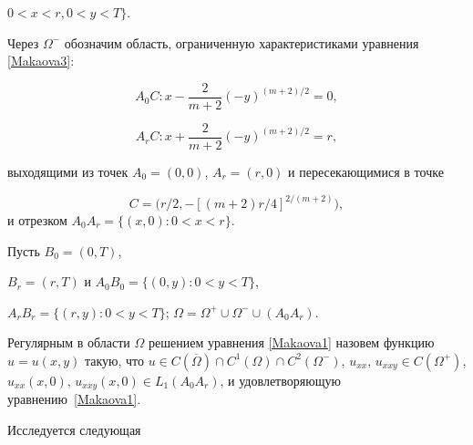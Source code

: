 \begin{minipage}{0.60\textwidth}

	\hspace{1em} %



$ 0<x<r, 0<y<T \}$. 

 Через $\Omega^-$ обозначим область, ограниченную характеристиками уравнения \eqref{Makaova3}:  

\[A_0C: x-\frac{2}{m+2}(-y)^{({m+2})/{2}}=0,

\]

\[A_rC: x+\frac{2}{m+2}(-y)^{({m+2})/{2}}=r,

\]

выходящими из точек $A_0=(0, 0)$, $A_r=(r, 0)$ и пересекающимися в точке 

$$C=\bigl(r/2, - [(m+2)r/4]^{2/(m+2)} \bigr),$$ и отрезком $A_0A_r=\{(x,0): 0<x<r \}$. 

Пусть $B_0=(0,T)$, 

$B_r=(r,T)$ и $A_0B_0=\{(0,y):0<y<T\}$, 

$A_rB_r=\{(r,y):0<y<T\}$; $\Omega=\Omega^+ \cup \Omega^- \cup (A_0A_r)$.	

\end{minipage}









\begin{definition}

Регулярным в области $\Omega$ решением уравнения \eqref{Makaova1} назовем функцию $u=u(x,y)$ такую, что $u \in C( \overline{\Omega}) \cap C^1(\Omega) \cap C^2(\Omega^-)$, $u_{xx}$, $u_{xxy} \in C(\Omega^+)$, $u_{xx}(x,0)$, $u_{xxy}(x,0) \in L_1(A_0A_r)$,  и удовлетворяющую уравнению~\eqref{Makaova1}.

\end{definition} 



\smallskip



Исследуется следующая 

\smallskip

